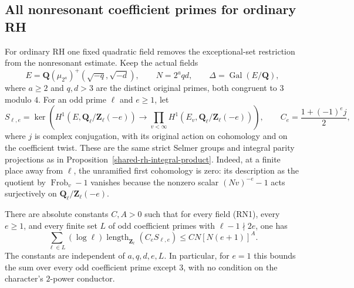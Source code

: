 \subsection{All nonresonant coefficient primes for ordinary RH}
\label{sec:rh-selmer-nonresonant}

For ordinary RH one fixed quadratic field removes the exceptional-set
restriction from the nonresonant estimate.  Keep the actual fields
\[
 E=\mathbf Q(\mu_{2^a})^+(\sqrt{-q},\sqrt{-d}),\qquad
 N=2^aqd,\qquad \Delta=\operatorname{Gal}(E/\mathbf Q),
                                                               \tag{RN1}
\]
where $a\ge2$ and $q,d>3$ are the distinct original primes,
both congruent to $3$ modulo $4$.  For an odd prime $\ell$ and
$e\ge1$, let
\[
 S_{\ell,e}=\ker\!\left(
 H^1(E,\mathbf Q_\ell/\mathbf Z_\ell(-e))
   \longrightarrow\prod_{v<\infty}
                 H^1(E_v,\mathbf Q_\ell/\mathbf Z_\ell(-e))
                         \right),\qquad
 C_e=\frac{1+(-1)^ej}{2},                                    \tag{RN2}
\]
where $j$ is complex conjugation, with its original action on
cohomology and on the coefficient twist.  These are the same
strict Selmer groups and integral parity projections as in
Proposition~\ref{shared-rh-integral-product}.
Indeed, at a finite place away from $\ell$, the unramified
first cohomology is zero: its description as the quotient
by $\operatorname{Frob}_v-1$ vanishes because the nonzero
scalar $(Nv)^{-e}-1$ acts surjectively on
$\mathbf Q_\ell/\mathbf Z_\ell(-e)$.

\begin{theorem}
\label{thm:rh-selmer-all-nonresonant}
There are absolute constants $C,A>0$ such that for every
field (RN1), every $e\ge1$, and every finite set $L$ of odd
coefficient primes with $\ell-1\nmid2e$, one has
\[
 \sum_{\ell\in L}(\log\ell)
           \operatorname{length}_{\mathbf Z_\ell}(C_eS_{\ell,e})
              \le C N[N(e+1)]^A.                            \tag{RN3}
\]
The constants are independent of $a,q,d,e,L$.  In particular,
for $e=1$ this bounds the sum over every odd coefficient
prime except $3$, with no condition on the character's
$2$-power conductor.
\end{theorem}

